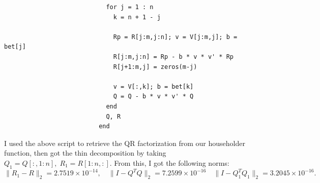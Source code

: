 \documentclass[11pt]{article}
\begin{document}
\begin{enumerate}
\begin{verbatim}
                            for j = 1 : n
                              k = n + 1 - j
                          
                              Rp = R[j:m,j:n]; v = V[j:m,j]; b = bet[j]
                              R[j:m,j:n] = Rp - b * v * v' * Rp
                              R[j+1:m,j] = zeros(m-j)
                          
                              v = V[:,k]; b = bet[k]
                              Q = Q - b * v * v' * Q
                            end
                            Q, R
                          end
\end{verbatim}
    I used the above script to retrieve the QR factorization from our householder function, then got the thin decomposition by taking \(Q_1 = Q[:,1:n], \; R_1 = R[1:n,:]\).  From this, I got the following norms:
    \[\lVert R_1 - R \rVert_2 = 2.7519 \times 10^{-14}, \quad \lVert I - Q^T Q \rVert_2 = 7.2599 \times 10^{-16} \quad \lVert I - Q_1^T Q_1 \rVert_2 = 3.2045 \times 10^{-16}.\]
\end{enumerate}
\end{document}
